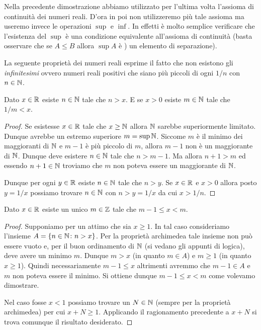Nella precedente dimostrazione abbiamo utilizzato per l'ultima volta
l'assioma di continuità dei numeri reali.
D'ora in poi non utilizzeremo più tale assioma ma useremo invece
le operazioni $\sup$ e $\inf$.
In effetti è molto semplice verificare che l'esistenza del $\sup$
è una condizione equivalente all'assioma di continuità
(basta osservare che se $A\le B$ allora $\sup A$ è )
un elemento di separazione).

La seguente proprietà dei numeri reali esprime il fatto
che non esistono gli \emph{infinitesimi} ovvero numeri reali positivi
che siano più piccoli di ogni $1/n$ con $n\in \mathbb N$.

\begin{theorem}
\mymark{**}
Dato $x\in \mathbb R$ esiste $n\in \mathbb N$ tale che $n > x$.
E se $x>0$ esiste $m\in \mathbb N$ tale che $1/m < x$.
\end{theorem}
%
\begin{proof}
\mymark{*}
Se esistesse $x\in \mathbb R$ tale che $x \ge \mathbb N$
allora $\mathbb N$ sarebbe superiormente limitato.
Dunque avrebbe un estremo superiore $m= \sup \mathbb N$.
Siccome $m$ è il minimo dei maggioranti di $\mathbb N$
e $m-1$ è più piccolo di $m$, allora $m-1$ non è un maggiorante
di $\mathbb N$. Dunque deve esistere $n\in \mathbb N$ tale che $n>m-1$.
Ma allora $n+1 > m$ ed essendo $n+1\in \mathbb N$ troviamo che $m$
non poteva essere un maggiorante di $\mathbb N$.

Dunque per ogni $y\in \mathbb R$ esiste $n\in \mathbb N$ tale che $n>y$.
Se $x\in \mathbb R$ e $x>0$ allora posto $y=1/x$ possiamo trovare
$n\in \mathbb N$ con $n>y = 1/x$ da cui $x > 1/n$.
\end{proof}

\begin{theorem}
\mymark{*}
Dato $x\in \mathbb R$ esiste un unico $m\in \mathbb Z$ tale che $m-1 \le x < m$.
\end{theorem}
%
\begin{proof}
Supponiamo per un attimo che sia $x\ge 1$.
In tal caso consideriamo l'insieme $A={\left\{ n\in \mathbb N\colon n > x \right\}}$.
Per la proprietà archimedea tale insieme non può essere vuoto e,
per il buon ordinamento di $\mathbb N$ (si vedano gli appunti di logica),
deve avere un minimo $m$.
Dunque $m>x$ (in quanto $m\in A$) e $m\ge 1$ (in quanto $x\ge 1$).
Quindi necessariamente $m-1 \le x$ altrimenti avremmo che $m-1\in A$ e $m$
non poteva essere il minimo. Si ottiene dunque $m-1\le x < m$ come volevamo
dimostrare.

Nel caso fosse $x<1$ possiamo trovare un $N\in \mathbb N$ (sempre per la proprietà archimedea) per cui $x+N \ge 1$. Applicando il ragionamento precedente a $x+N$ si trova comunque il risultato desiderato.
\end{proof}

